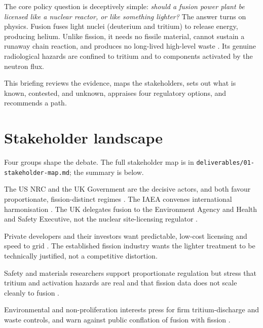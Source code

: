 \documentclass[11pt,a4paper]{article}
\begin{document}
The core policy question is deceptively simple: \emph{should a fusion power plant
be licensed like a nuclear reactor, or like something lighter?} The answer turns
on physics. Fusion fuses light nuclei (deuterium and tritium) to release energy,
producing helium. Unlike fission, it needs no fissile material, cannot sustain a
runaway chain reaction, and produces no long-lived high-level waste
\citep{ukfusionregfactsheet,iterstafetybasis}. Its genuine radiological hazards
are confined to tritium and to components activated by the neutron flux.

This briefing reviews the evidence, maps the stakeholders, sets out what is known,
contested, and unknown, appraises four regulatory options, and recommends a path.

\section{Stakeholder landscape}

Four groups shape the debate. The full stakeholder map is in
\texttt{deliverables/01-stakeholder-map.md}; the summary is below.

\begin{description}[leftmargin=1.2em]
  \item[Regulators and government.] The US NRC and the UK Government are the
  decisive actors, and both favour proportionate, fission-distinct regimes
  \citep{nrc2023vote,ukfusionregfactsheet}. The IAEA convenes international
  harmonisation \citep{iaea2023meeting}. The UK delegates fusion to the
  Environment Agency and Health and Safety Executive, not the nuclear
  site-licensing regulator \citep{ukenvagency2022}.
  \item[Industry.] Private developers and their investors want predictable,
  low-cost licensing and speed to grid \citep{crs2026fusion}. The established
  fission industry wants the lighter treatment to be technically justified, not a
  competitive distortion.
  \item[Researchers.] Safety and materials researchers support proportionate
  regulation but stress that tritium and activation hazards are real and that
  fission data does not scale cleanly to fusion
  \citep{iterstafetybasis,tritiumbreeding2018}.
  \item[Public-interest groups.] Environmental and non-proliferation interests
  press for firm tritium-discharge and waste controls, and warn against public
  conflation of fusion with fission \citep{iaeatritiumharmonization,proportionate2024}.
\end{description}
\end{document}
